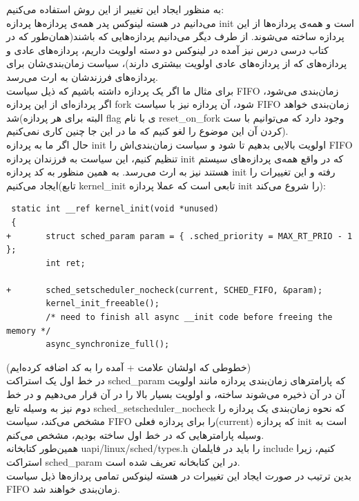 \documentclass{article}
\begin{document}
به منظور ایجاد این تغییر از این روش استفاده می‌کنیم:
\\
می‌دانیم در هسته لینوکس پدر همه‌ی پردازه‌ها پردازه‌ init است و همه‌ی پردازه‌ها از این پردازه ساخته‌ می‌شوند. از طرف دیگر می‌دانیم پردازه‌هایی که  باشند(همان‌طور که در کتاب درسی درس نیز آمده در لینوکس دو دسته اولویت داریم، پردازه‌های عادی و پردازه‌های  که از پردازه‌های عادی اولویت بیشتری دارند)، سیاست زمان‌بندی‌شان برای پرداز‌ه‌های فرزندشان به ارث می‌رسد.
\\
برای مثال ما اگر یک پردازه  داشته باشیم که ذیل سیاست FIFO زمان‌بندی می‌شود، اگر پردازه‌ای از این پردازه fork شود، آن پردازه نیز با سیاست FIFO زمان‌بندی خواهد شد(البته برای هر پردازه flag ی با نام reset\_on\_fork وجود دارد که می‌توانیم با ست کردن آن این موضوع را لغو کنیم که ما در این جا چنین کاری نمی‌کنیم).
\\
حال اگر ما به پردازه init اولویت بالایی بدهیم تا  شود و سیاست زمان‌بندی‌اش را FIFO تنظیم کنیم، این سیاست به فرزندان پردازه init که در واقع همه‌ی پردازه‌های سیستم هستند نیز به ارث می‌رسد. به همین منظور به کد پردازه init رفته و این تغییرات را ایجاد می‌کنیم(تابع kernel\_init تابعی است که عملا پردازه init را شروع می‌کند):

\begin{latin}
\begin{verbatim}
 static int __ref kernel_init(void *unused)
 {
+       struct sched_param param = { .sched_priority = MAX_RT_PRIO - 1 };
        int ret;

+       sched_setscheduler_nocheck(current, SCHED_FIFO, &param);
        kernel_init_freeable();
        /* need to finish all async __init code before freeing the memory */
        async_synchronize_full();
\end{verbatim}
\end{latin}
(خطوطی که اولشان علامت + آمده را به کد اضافه کرده‌ایم)
\\
در خط اول یک استراکت sched\_param که پارامتر‌های زمان‌بندی پردازه‌ مانند اولویت آن در آن ذخیره می‌شوند ساخته، و اولویت بسیار بالا را در آن قرار می‌دهیم و در خط دوم نیز به وسیله تابع sched\_setscheduler\_nocheck که نحوه زمان‌بندی یک پردازه را مشخص می‌کند، سیاست FIFO را برای پردازه فعلی(current) که پردازه init است به وسیله پارامتر‌هایی که در خط اول ساخته بودیم، مشخص می‌کنم.
\\
همین‌طور کتابخانه uapi/linux/sched/types.h را باید در فایلمان include کنیم، زیرا استراکت sched\_param در این کتابخانه تعریف شده است.
\\
بدین ترتیب در صورت ایجاد این تغییرات در هسته لینوکس تمامی پردازه‌ها ذیل سیاست FIFO زمان‌بندی خواهند شد.
\end{document}
